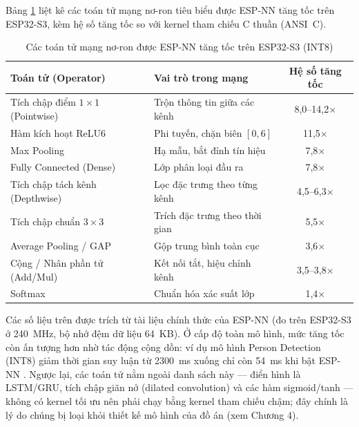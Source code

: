 \documentclass[../DoAn.tex]{subfiles}
\begin{document}
Bảng \ref{tab:espnn_ops} liệt kê các toán tử mạng nơ-ron tiêu biểu được ESP-NN tăng tốc trên ESP32-S3, kèm hệ số tăng tốc so với kernel tham chiếu C thuần (ANSI~C).

\begin{table}[H]
\centering
\caption{Các toán tử mạng nơ-ron được ESP-NN tăng tốc trên ESP32-S3 (INT8)}
\label{tab:espnn_ops}
\begin{tabular}{|l|l|c|}
\hline
\textbf{Toán tử (Operator)} & \textbf{Vai trò trong mạng} & \textbf{Hệ số tăng tốc} \\
\hline
Tích chập điểm $1\times1$ (Pointwise)   & Trộn thông tin giữa các kênh   & 8,0--14,2$\times$ \\
Hàm kích hoạt ReLU6                     & Phi tuyến, chặn biên $[0,6]$   & 11,5$\times$ \\
Max Pooling                            & Hạ mẫu, bắt đỉnh tín hiệu      & 7,8$\times$ \\
Fully Connected (Dense)                & Lớp phân loại đầu ra           & 7,8$\times$ \\
Tích chập tách kênh (Depthwise)        & Lọc đặc trưng theo từng kênh   & 4,5--6,3$\times$ \\
Tích chập chuẩn $3\times3$             & Trích đặc trưng theo thời gian & 5,5$\times$ \\
Average Pooling / GAP                  & Gộp trung bình toàn cục        & 3,6$\times$ \\
Cộng / Nhân phần tử (Add/Mul)          & Kết nối tắt, hiệu chỉnh kênh   & 3,5--3,8$\times$ \\
Softmax                                & Chuẩn hóa xác suất lớp         & 1,4$\times$ \\
\hline
\end{tabular}
\end{table}

Các số liệu trên được trích từ tài liệu chính thức của ESP-NN \cite{espressif2023espnn} (đo trên ESP32-S3 ở 240~MHz, bộ nhớ đệm dữ liệu 64~KB). Ở cấp độ toàn mô hình, mức tăng tốc còn ấn tượng hơn nhờ tác động cộng dồn: ví dụ mô hình Person Detection (INT8) giảm thời gian suy luận từ 2300~ms xuống chỉ còn 54~ms khi bật ESP-NN \cite{espressif2024esptflitemicro}. Ngược lại, các toán tử nằm ngoài danh sách này --- điển hình là LSTM/GRU, tích chập giãn nở (dilated convolution) và các hàm sigmoid/tanh --- không có kernel tối ưu nên phải chạy bằng kernel tham chiếu chậm; đây chính là lý do chúng bị loại khỏi thiết kế mô hình của đồ án (xem Chương 4).
\end{document}
